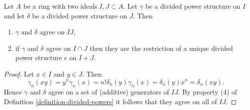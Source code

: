 \begin{lemma}
\label{lemma-two-ideals}
Let $A$ be a ring with two ideals $I, J \subset A$.
Let $\gamma$ be a divided power structure on $I$ and let
$\delta$ be a divided power structure on $J$.
Then
\begin{enumerate}
\item $\gamma$ and $\delta$ agree on $IJ$,
\item if $\gamma$ and $\delta$ agree on $I \cap J$ then they are
the restriction of a unique divided power structure $\epsilon$
on $I + J$.
\end{enumerate}
\end{lemma}

\begin{proof}
Let $x \in I$ and $y \in J$. Then
$$
\gamma_n(xy) = y^n\gamma_n(x) = n! \delta_n(y) \gamma_n(x) =
\delta_n(y) x^n = \delta_n(xy).
$$
Hence $\gamma$ and $\delta$ agree on a set of (additive) generators
of $IJ$. By property (4) of Definition \ref{definition-divided-powers}
it follows that they agree on all of $IJ$.


\end{proof}

